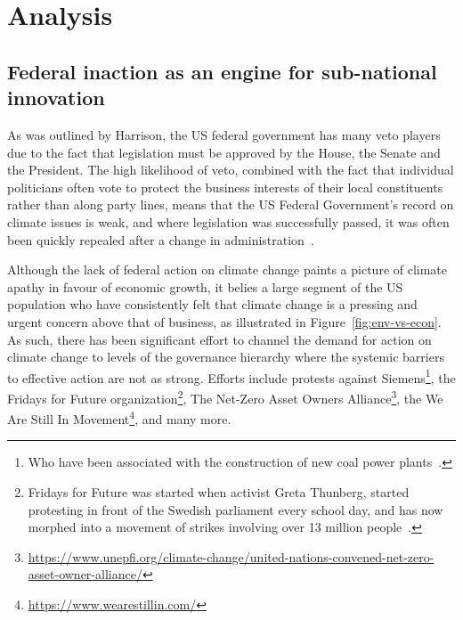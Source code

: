\section{Analysis} %

\subsection{Federal inaction as an engine for sub-national innovation}

As was outlined by Harrison, the US federal government has many veto
players due to the fact that legislation must be approved by the
House, the Senate and the President. The high likelihood of veto,
combined with the fact that individual politicians often vote to
protect the business interests of their local constituents rather than
along party lines, means that the US Federal Government's record on
climate issues is weak, and where legislation was successfully passed,
it was often been quickly repealed after a change in
administration~\citep{harrison2010united}.

Although the lack of federal action on climate change paints a picture
of climate apathy in favour of economic growth, it belies a large
segment of the US population who have consistently felt that climate
change is a pressing and urgent concern above that of business, as
illustrated in Figure~\ref{fig:env-vs-econ}. As such, there has been
significant effort to channel the demand for action on climate change
to levels of the governance hierarchy where the systemic barriers to
effective action are not as strong. Efforts include protests against
Siemens\footnote{Who have been associated with the construction of new
  coal power plants~\citep{dw2020,greenpeace2020}.}, the Fridays for
Future organization\footnote{Fridays for Future was started when
  activist Greta Thunberg, started protesting in front of the Swedish
  parliament every school day, and has now morphed into a movement of
  strikes involving over 13 million people~\citep{fff}.}, The Net-Zero
Asset Owners
Alliance\footnote{\url{https://www.unepfi.org/climate-change/united-nations-convened-net-zero-asset-owner-alliance/}},
the We Are Still In
Movement\footnote{\url{https://www.wearestillin.com/}}, and many more.



